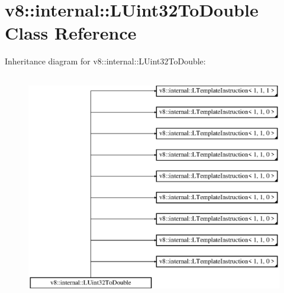 \hypertarget{classv8_1_1internal_1_1_l_uint32_to_double}{}\section{v8\+:\+:internal\+:\+:L\+Uint32\+To\+Double Class Reference}
\label{classv8_1_1internal_1_1_l_uint32_to_double}
Inheritance diagram for v8\+:\+:internal\+:\+:L\+Uint32\+To\+Double\+:\begin{figure}[H]
\begin{center}
\leavevmode
\includegraphics[height=10.000000cm]{classv8_1_1internal_1_1_l_uint32_to_double}
\end{center}
\end{figure}
